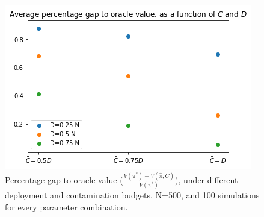 \documentclass[11pt,a4paper]{article}
\begin{document}
\begin{figure}[!h]
\begin{center}
\includegraphics[scale=0.5]{simplot}
\caption{Percentage gap to oracle value ($\frac{ V(\pi^*) - V(\hat \pi, \bar{C})}{V(\pi^*) }$), under different deployment and contamination budgets. N=500, and 100 simulations for every parameter combination.}
\end{center}
\end{figure}



%
%
%
%
%
\end{document}
